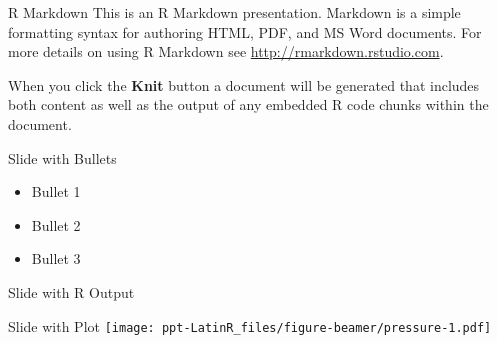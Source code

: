 \documentclass[
  ignorenonframetext,
]{beamer}
\providecommand{\tightlist}{%
  \setlength{\itemsep}{0pt}\setlength{\parskip}{0pt}}
\begin{document}
\begin{frame}{R Markdown}
\protect\hypertarget{r-markdown}{}
This is an R Markdown presentation. Markdown is a simple formatting
syntax for authoring HTML, PDF, and MS Word documents. For more details
on using R Markdown see \url{http://rmarkdown.rstudio.com}.

When you click the \textbf{Knit} button a document will be generated
that includes both content as well as the output of any embedded R code
chunks within the document.
\end{frame}

\begin{frame}{Slide with Bullets}
\protect\hypertarget{slide-with-bullets}{}
\begin{itemize}
\tightlist
\item
  Bullet 1
\item
  Bullet 2
\item
  Bullet 3
\end{itemize}
\end{frame}

\begin{frame}{Slide with R Output}
\protect\hypertarget{slide-with-r-output}{}
\end{frame}

\begin{frame}{Slide with Plot}
\protect\hypertarget{slide-with-plot}{}
\texttt{[image: ppt-LatinR\_files/figure-beamer/pressure-1.pdf]}
\end{frame}
\end{document}
